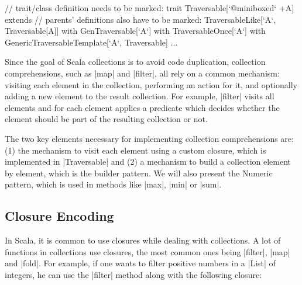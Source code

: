 \begin{lstlisting-nobreak}
 // trait/class definition needs to be marked:
 trait Traversable[`@miniboxed` +A] extends
 // parents' definitions also have to be marked:
       TraversableLike[`A`, Traversable[A]]
       with GenTraversable[`A`]
       with TraversableOnce[`A`]
       with GenericTraversableTemplate[`A`, Traversable] { ... }
\end{lstlisting-nobreak}


Since the goal of Scala collections is to avoid code duplication, collection comprehensions, such as |map| and |filter|, all rely on a common mechanism: visiting each element in the collection, performing an action for it, and optionally adding a new element to the result collection. For example, |filter| visits all elements and for each element applies a predicate which decides whether the element should be part of the resulting collection or not.

The two key elements necessary for implementing collection comprehensions are: (1) the mechanism to visit each element using a custom closure, which is implemented in |Traversable| and (2) a mechanism to build a collection element by element, which is the builder pattern. We will also present the Numeric pattern, which is used in methods like |max|, |min| or |sum|.

\subsection{Closure Encoding}

In Scala, it is common to use closures while dealing with collections. A lot of functions in collections use closures, the most common ones being |filter|, |map| and |fold|. For example, if one wants to filter positive numbers in a |List| of integers, he can use the |filter| method along with the following closure:


